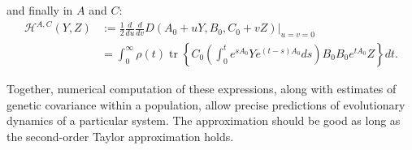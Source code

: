 \documentclass{article}
\newif\ifsubmission
\newcommand{\tr}{\mathop{\mbox{tr}}} %
\newcommand{\1}{\mathbbm{1}}
\begin{document}
and finally in $A$ and $C$:
\begin{equation}
    \begin{aligned}
        \mathcal{H}^{A,C}(Y,Z)
        &:= 
        \frac{1}{2} \frac{d}{du} \frac{d}{dv} D(A_0+uY,B_0,C_0+vZ)\vert_{u=v=0} \\
        &=
        \int_0^\infty \rho(t) \tr\left\{ 
        C_0 \left(\int_0^t e^{s A_0} Y e^{(t-s) A_0} ds \right) B_0
        B_0 e^{t A_0} Z
        \right\} dt  .
  \end{aligned}
\end{equation}

Together, numerical computation of these expressions,
along with estimates of genetic covariance within a population,
allow precise predictions of evolutionary dynamics of a particular system.
The approximation should be good as long as the second-order Taylor approximation holds.


\end{document}
